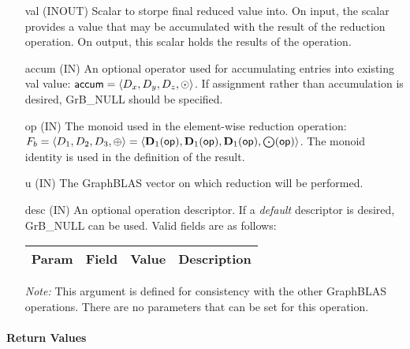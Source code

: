 \begin{itemize}[leftmargin=1.1in]
    \item[{\sf val}]    ({\sf INOUT}) Scalar to storpe final reduced value into. On input,
    the scalar provides a value that may be accumulated with the result of the
    reduction operation.  On output, this scalar holds the results of the
    operation.

    \item[{\sf accum}]    ({\sf IN}) An optional operator used for accumulating
    entries into existing {\sf val} value: ${\sf accum} = \langle D_x,
    D_y, D_z,\odot \rangle$. If assignment rather than accumulation is
    desired, {\sf GrB\_NULL} should be specified.

    \item[{\sf op}]    ({\sf IN}) The monoid 
    used in the element-wise reduction operation:
    $F_b=\langle D_1,D_2,D_3,\oplus \rangle = \langle \bold{D}_1({\sf op}), \bold{D}_1({\sf op}),
    \bold{D}_1({\sf op}),\bold{\bigodot}({\sf op})\rangle$.
    The monoid identity is used in the definition of the result.
    
    \item[{\sf u}]     ({\sf IN}) The GraphBLAS vector on which
	    reduction will be performed.
    
    \item[{\sf desc}]  ({\sf IN}) An optional operation descriptor.  If a \emph{default}
    descriptor is desired, {\sf GrB\_NULL} can be used.
    Valid fields are
    as follows: \\
    
    \begin{tabular}{lllp{2.5in}}
        Param & Field  & Value & Description \\
        \hline
    \end{tabular}

    \emph{Note:} This argument is defined for consistency with the other GraphBLAS operations.
    There are no parameters that can be set for this operation.
\end{itemize}

\paragraph{Return Values}

